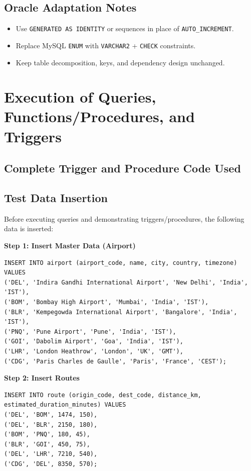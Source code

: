 \documentclass[12pt, a4paper]{article}
\begin{document}


\subsection{Oracle Adaptation Notes}
\begin{itemize}
    \item Use \texttt{GENERATED AS IDENTITY} or sequences in place of \texttt{AUTO\_INCREMENT}.
    \item Replace MySQL \texttt{ENUM} with \texttt{VARCHAR2} + \texttt{CHECK} constraints.
    \item Keep table decomposition, keys, and dependency design unchanged.
\end{itemize}

\section{Execution of Queries, Functions/Procedures, and Triggers}

\subsection{Complete Trigger and Procedure Code Used}


\subsection{Test Data Insertion}

Before executing queries and demonstrating triggers/procedures, the following data is inserted:

\textbf{Step 1: Insert Master Data (Airport)}
\begin{lstlisting}[style=sqlstyle]
INSERT INTO airport (airport_code, name, city, country, timezone) VALUES
('DEL', 'Indira Gandhi International Airport', 'New Delhi', 'India', 'IST'),
('BOM', 'Bombay High Airport', 'Mumbai', 'India', 'IST'),
('BLR', 'Kempegowda International Airport', 'Bangalore', 'India', 'IST'),
('PNQ', 'Pune Airport', 'Pune', 'India', 'IST'),
('GOI', 'Dabolim Airport', 'Goa', 'India', 'IST'),
('LHR', 'London Heathrow', 'London', 'UK', 'GMT'),
('CDG', 'Paris Charles de Gaulle', 'Paris', 'France', 'CEST');
\end{lstlisting}

\textbf{Step 2: Insert Routes}
\begin{lstlisting}[style=sqlstyle]
INSERT INTO route (origin_code, dest_code, distance_km, estimated_duration_minutes) VALUES
('DEL', 'BOM', 1474, 150),
('DEL', 'BLR', 2150, 180),
('BOM', 'PNQ', 180, 45),
('BLR', 'GOI', 450, 75),
('DEL', 'LHR', 7210, 540),
('CDG', 'DEL', 8350, 570);
\end{lstlisting}
\end{document}
